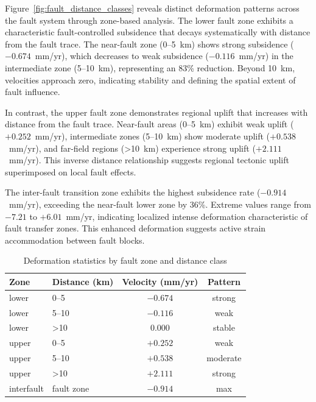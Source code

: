 \documentclass[oneside,doublespacing,flushright]{lsuthesis}
\begin{document}
Figure~\ref{fig:fault_distance_classes} reveals distinct deformation patterns across the fault system through zone-based analysis. The lower fault zone exhibits a characteristic
fault-controlled subsidence that decays systematically with distance from the fault trace. The near-fault zone (0--5~km) shows strong subsidence ($-0.674$~mm/yr), which decreases to weak subsidence ($-0.116$~mm/yr) in the intermediate zone (5--10~km), representing an 83\% reduction. Beyond 10~km, velocities approach zero, indicating stability and defining the spatial extent of fault influence.

In contrast, the upper fault zone demonstrates regional uplift that increases with distance from the fault trace. Near-fault areas (0--5~km) exhibit weak uplift ($+0.252$~mm/yr), 
intermediate zones (5--10~km) show moderate uplift ($+0.538$~mm/yr), and far-field regions (>10~km) experience strong uplift ($+2.111$~mm/yr). This inverse distance relationship 
suggests regional tectonic uplift superimposed on local fault effects.

The inter-fault transition zone exhibits the highest subsidence rate ($-0.914$~mm/yr), exceeding the near-fault lower zone by 36\%. Extreme values range from $-7.21$ to $+6.01$~mm/yr, 
indicating localized intense deformation characteristic of fault transfer zones. This enhanced deformation suggests active strain accommodation between fault blocks.



\begin{table}[!t]
\centering
\caption{Deformation statistics by fault zone and distance class}
\label{tab:fault_zones}
\begin{tabular}{llcc}
\hline
\textbf{Zone} & \textbf{Distance (km)} & \textbf{Velocity (mm/yr)} & \textbf{Pattern} \\
\hline
lower  & 0--5  & $-0.674$ & strong  \\
lower  & 5--10  & $-0.116$ & weak  \\
lower  & >10  & $0.000$ & stable \\
\hline
upper  & 0--5  & $+0.252$ & weak  \\
upper  & 5--10  & $+0.538$ & moderate  \\
upper  & >10  & $+2.111$ & strong  \\
\hline
interfault &fault zone & $-0.914$ & max \\ 
\hline
\end{tabular}
\end{table}
\end{document}
